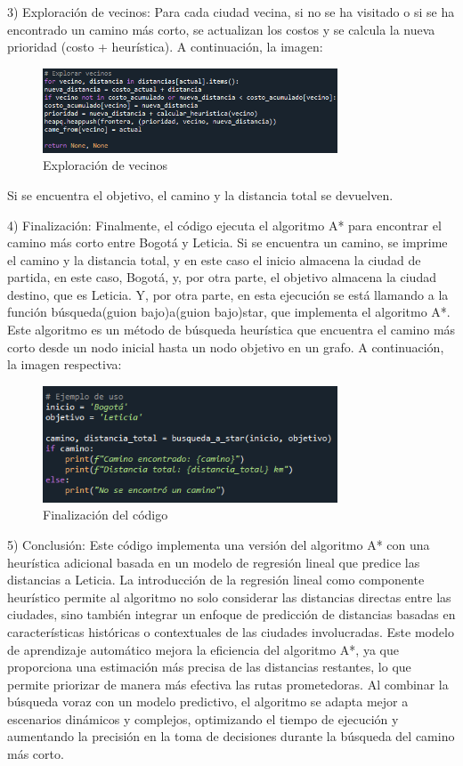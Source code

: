 \documentclass[conference]{IEEEtran}
\begin{document}
\begin{itemize}
	3) Exploración de vecinos: Para cada ciudad vecina, si no se ha visitado o si se ha encontrado un camino más corto, se actualizan los costos y se calcula la nueva prioridad (costo + heurística). A continuación, la imagen:
		\begin{figure}[ht!] %
			\centering
			\includegraphics[width=3.45in]{Imagen36.png}
			\caption{Exploración de vecinos}
			\label{picture}
		\end{figure}	
		
	Si se encuentra el objetivo, el camino y la distancia total se devuelven.
	
	4) Finalización: Finalmente, el código ejecuta el algoritmo A* para encontrar el camino más corto entre Bogotá y Leticia. Si se encuentra un camino, se imprime el camino y la distancia total, y en este caso el inicio almacena la ciudad de partida, en este caso, Bogotá, y, por otra parte, el objetivo almacena la ciudad destino, que es Leticia. Y, por otra parte, en esta ejecución se está llamando a la función búsqueda(guion bajo)a(guion bajo)star, que implementa el algoritmo A*. Este algoritmo es un método de búsqueda heurística que encuentra el camino más corto desde un nodo inicial hasta un nodo objetivo en un grafo. A continuación, la imagen respectiva:
		\begin{figure}[ht!] %
			\centering
			\includegraphics[width=3.45in]{Imagen39.png}
			\caption{Finalización del código}
			\label{picture}
		\end{figure}
	
	5) Conclusión: Este código implementa una versión del algoritmo A* con una heurística adicional basada en un modelo de regresión lineal que predice las distancias a Leticia. La introducción de la regresión lineal como componente heurístico permite al algoritmo no solo considerar las distancias directas entre las ciudades, sino también integrar un enfoque de predicción de distancias basadas en características históricas o contextuales de las ciudades involucradas. Este modelo de aprendizaje automático mejora la eficiencia del algoritmo A*, ya que proporciona una estimación más precisa de las distancias restantes, lo que permite priorizar de manera más efectiva las rutas prometedoras. Al combinar la búsqueda voraz con un modelo predictivo, el algoritmo se adapta mejor a escenarios dinámicos y complejos, optimizando el tiempo de ejecución y aumentando la precisión en la toma de decisiones durante la búsqueda del camino más corto.
	

\end{itemize}
\end{document}

